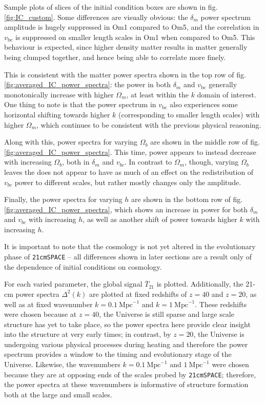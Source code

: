 \documentclass[floats,floatfix,showpacs,amssymb,prd,superscriptaddress,nofootinbib]{revtex4-2} %
\newcommand{\code}{\texttt}
\begin{document}
Sample plots of slices of the initial condition boxes are shown in fig. \ref{fig:IC_custom}. Some differences are visually obvious: the $\delta_m$ power spectrum amplitude is hugely suppressed in Om1 compared to Om5, and the correlation in $v_{\text{bc}}$ is suppressed on smaller length scales in Om1 when compared to Om5. This behaviour is expected, since higher density matter results in matter generally being clumped together, and hence being able to correlate more finely. 

This is consistent with the matter power spectra shown in the top row of fig. \ref{fig:averaged_IC_power_spectra}: the power in both $\delta_m$ and $v_{\text{bc}}$ generally monotonically increase with higher $\Omega_m$, at least within the $k$ domain of interest. One thing to note is that the power spectrum in $v_{\text{bc}}$ also experiences some horizontal shifting towards higher $k$ (corresponding to smaller length scales) with higher $\Omega_m$, which continues to be consistent with the previous physical reasoning.

Along with this, power spectra for varying $\Omega_b$ are shown in the middle row of fig. \ref{fig:averaged_IC_power_spectra}. This time, power appears to instead decrease with increasing $\Omega_b$, both in $\delta_m$ and $v_{bc}$. In contrast to $\Omega_m$, though, varying $\Omega_b$ leaves the  does not appear to have as much of an effect on the redistribution of $v_{bc}$ power to different scales, but rather mostly changes only the amplitude.

Finally, the power spectra for varying $h$ are shown in the bottom row of fig. \ref{fig:averaged_IC_power_spectra}, which shows an increase in power for both $\delta_m$ and $v_{bc}$ with increasing $h$, as well as another shift of power towards higher $k$ with increasing $h$.

It is important to note that the cosmology is not yet altered in the evolutionary phase of \code{21cmSPACE} -- all differences shown in later sections are a result only of the dependence of initial conditions on cosmology. 

For each varied parameter, the global signal $\overline{T}_{21}$ is plotted. Additionally, the 21-cm power spectra $\Delta^2(k)$ are plotted at fixed redshifts of $z = 40$ and $z = 20$, as well as at fixed wavenumber $k = 0.1 ~\text{Mpc}^{-1}$ and $k = 1 ~\text{Mpc}^{-1}$. These redshifts were chosen because at $z = 40$, the Universe is still sparse and large scale structure has yet to take place, so the power spectra here provide clear insight into the structure at very early times; in contrast, by $z = 20$, the Universe is undergoing various physical processes during heating and therefore the power spectrum provides a window to the timing and evolutionary stage of the Universe. Likewise, the wavenumbers $k = 0.1 ~\text{Mpc}^{-1}$ and $1 ~\text{Mpc}^{-1}$ were chosen because they are at opposing ends of the scales probed by \code{21cmSPACE}; therefore, the power spectra at these wavenumbers is informative of structure formation both at the large and small scales.
\end{document}
